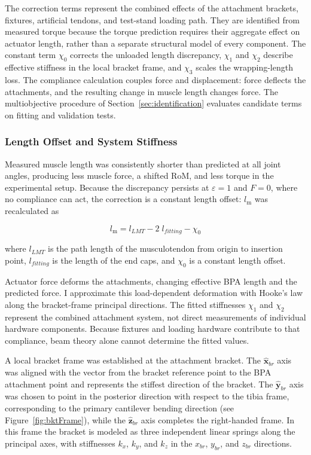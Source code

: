 The correction terms represent the combined effects of the attachment brackets, fixtures, artificial tendons, and test-stand loading path. They are identified from measured torque because the torque prediction requires their aggregate effect on actuator length, rather than a separate structural model of every component. The constant term $\chi_0$ corrects the unloaded length discrepancy, $\chi_1$ and $\chi_2$ describe effective stiffness in the local bracket frame, and $\chi_3$ scales the wrapping-length loss. The compliance calculation couples force and displacement: force deflects the attachments, and the resulting change in muscle length changes force. The multiobjective procedure of Section~\ref{sec:identification} evaluates candidate terms on fitting and validation tests.

\subsubsection{Length Offset and System Stiffness}\label{sec:offset_stiffness}

Measured muscle length was consistently shorter than predicted at all joint angles, producing less muscle force, a shifted RoM, and less torque in the experimental setup. Because the discrepancy persists at $\varepsilon=1$ and $F=0$, where no compliance can act, the correction is a constant length offset: $l_\text{m}$ was recalculated as

\begin{equation}
    l_\text{m} = l_{LMT} - 2\;l_{fitting} - \chi_{0} 
    \label{eq:Lm}
\end{equation}

where $l_{LMT}$ is the path length of the musculotendon from origin to insertion point, $l_{fitting}$ is the length of the end caps, and $\chi_{0}$ is a constant length offset. 

Actuator force deforms the attachments, changing effective BPA length and the predicted force. I approximate this load-dependent deformation with Hooke's law along the bracket-frame principal directions. The fitted stiffnesses $\chi_1$ and $\chi_2$ represent the combined attachment system, not direct measurements of individual hardware components. Because fixtures and loading hardware contribute to that compliance, beam theory alone cannot determine the fitted values.

A local bracket frame was established at the attachment bracket. The $\hat{\mathbf{x}}_{br}$ axis was aligned with the vector from the bracket reference point to the BPA attachment point and represents the stiffest direction of the bracket. The $\hat{\mathbf{y}}_{br}$ axis was chosen to point in the posterior direction with respect to the tibia frame, corresponding to the primary cantilever bending direction (see Figure~\ref{fig:bktFrame}), while the $\hat{\mathbf{z}}_{br}$ axis completes the right-handed frame. In this frame the bracket is modeled as three independent linear springs along the principal axes, with stiffnesses $k_{x}$, $k_{y}$, and $k_{z}$ in the $x_{br}$, $y_{br}$, and $z_{br}$ directions.

